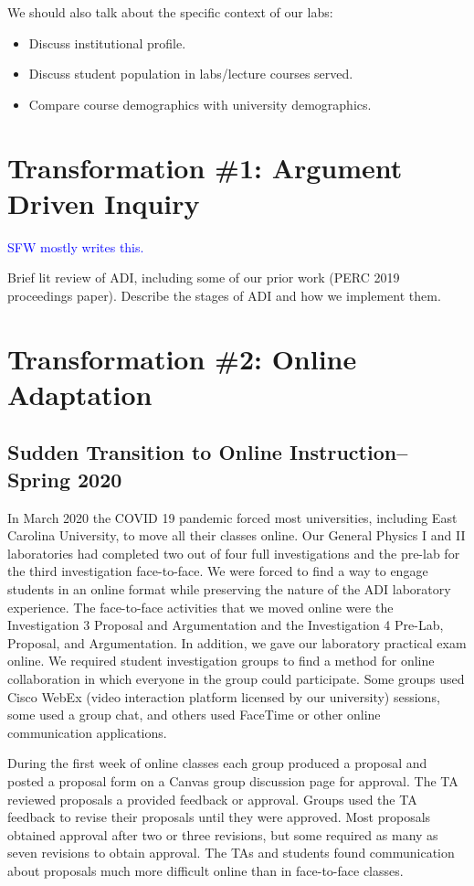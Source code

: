 \documentclass[aip, numerical, preprint]{revtex4-2}
\begin{document}
We should also talk about the specific context of our labs:
\begin{itemize}
  \item Discuss institutional profile.
  \item Discuss student population in labs/lecture courses served.
  \item Compare course demographics with university demographics.
\end{itemize}

\section{Transformation \#1: Argument Driven Inquiry}
\textcolor{blue}{SFW mostly writes this.}

Brief lit review of ADI, including some of our prior work (PERC 2019 proceedings paper).
Describe the stages of ADI and how we implement them.

\section{Transformation \#2: Online Adaptation}
\subsection{Sudden Transition to Online Instruction--Spring 2020}

In March 2020 the COVID 19 pandemic forced most universities, including East Carolina University, to move all their classes online. Our General Physics I and II laboratories had completed two out of four full investigations and the pre-lab for the third investigation face-to-face. We were forced to find a way to engage students in an online format while preserving the nature of the ADI laboratory experience. The face-to-face activities that we moved online were the Investigation 3 Proposal and Argumentation and the Investigation 4 Pre-Lab, Proposal, and Argumentation. In addition, we gave our laboratory practical exam online. We required student investigation groups to find a method for online collaboration in which everyone in the group could participate. Some groups used Cisco WebEx (video interaction platform licensed by our university) sessions, some used a group chat, and others used FaceTime or other online communication applications. 

During the first week of online classes each group produced a proposal and posted a proposal form on a Canvas group discussion page for approval. The TA reviewed proposals a provided feedback or approval. Groups used the TA feedback to revise their proposals until they were approved. Most proposals obtained approval after two or three revisions, but some required as many as seven revisions to obtain approval. The TAs and students found communication about proposals much more difficult online than in face-to-face classes. 
\end{document}

